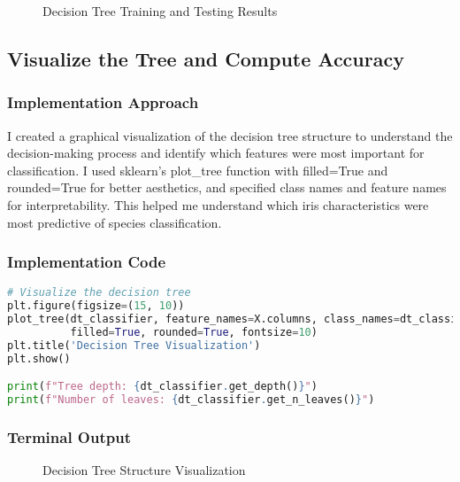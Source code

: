 \documentclass[12pt,a4paper]{article}
\begin{document}
\begin{figure}[h!]
    \centering
    \caption{Decision Tree Training and Testing Results}
\end{figure}

\subsection{Visualize the Tree and Compute Accuracy}

\subsubsection{Implementation Approach}
I created a graphical visualization of the decision tree structure to understand the decision-making process and identify which features were most important for classification. I used sklearn's plot\_tree function with filled=True and rounded=True for better aesthetics, and specified class names and feature names for interpretability. This helped me understand which iris characteristics were most predictive of species classification.

\subsubsection{Implementation Code}
\begin{lstlisting}[language=Python, caption=Visualize the Tree and Compute Accuracy]
# Visualize the decision tree
plt.figure(figsize=(15, 10))
plot_tree(dt_classifier, feature_names=X.columns, class_names=dt_classifier.classes_, 
          filled=True, rounded=True, fontsize=10)
plt.title('Decision Tree Visualization')
plt.show()

print(f"Tree depth: {dt_classifier.get_depth()}")
print(f"Number of leaves: {dt_classifier.get_n_leaves()}")
\end{lstlisting}

\subsubsection{Terminal Output}

\begin{figure}[h!]
    \centering
    \caption{Decision Tree Structure Visualization}
    \label{fig:dt_structure}
\end{figure}
\end{document}
